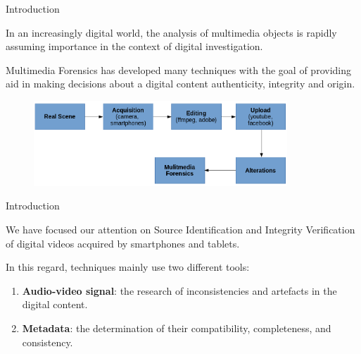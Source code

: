 \begin{tframe}{Introduction}

\vspace{0.2cm}

In an increasingly digital world, the analysis of multimedia objects is rapidly assuming importance in the context of digital investigation.

\vspace{0.2cm}

Multimedia Forensics has developed many techniques with the goal of providing aid in making decisions about a digital content authenticity, integrity and origin.

\begin{figure}
\centering
    \includegraphics[width=0.85\textwidth]{images/workflow.png}
\end{figure}

\end{tframe}

\begin{tframe}{Introduction}

\vspace{0.2cm}

We have focused our attention on Source Identification and Integrity Verification of digital videos acquired by smartphones and tablets.

\vspace{0.5cm}

In this regard, techniques mainly use two different tools:

\begin{enumerate}
\item \textbf{Audio-video signal}: the research of inconsistencies and artefacts in the digital content.
\item \textbf{Metadata}: the determination of their compatibility, completeness, and consistency.
\end{enumerate}

\end{tframe}

